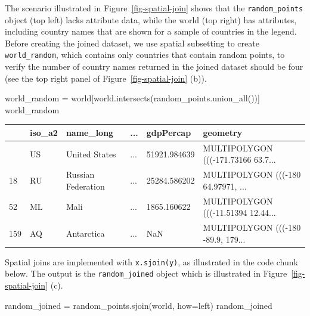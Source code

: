 \documentclass[
  letterpaper,
]{krantz}
\newenvironment{Shaded}{\begin{snugshade}}{\end{snugshade}}
\newcommand{\NormalTok}[1]{\textcolor[rgb]{0.00,0.23,0.31}{#1}}
\newcommand{\OperatorTok}[1]{\textcolor[rgb]{0.37,0.37,0.37}{#1}}
\newcommand{\StringTok}[1]{\textcolor[rgb]{0.13,0.47,0.30}{#1}}
\begin{document}
The scenario illustrated in Figure~\ref{fig-spatial-join} shows that the
\texttt{random\_points} object (top left) lacks attribute data, while
the world (top right) has attributes, including country names that are
shown for a sample of countries in the legend. Before creating the
joined dataset, we use spatial subsetting to create
\texttt{world\_random}, which contains only countries that contain
random points, to verify the number of country names returned in the
joined dataset should be four (see the top right panel of
Figure~\ref{fig-spatial-join} (b)).

\begin{Shaded}
\begin{Highlighting}[]
\NormalTok{world\_random }\OperatorTok{=}\NormalTok{ world[world.intersects(random\_points.union\_all())]}
\NormalTok{world\_random}
\end{Highlighting}
\end{Shaded}

\begin{longtable}[]{@{}llllll@{}}
\toprule\noalign{}
& iso\_a2 & name\_long & ... & gdpPercap & geometry \\
\midrule\noalign{}
\endhead
\bottomrule\noalign{}
\endlastfoot
4 & US & United States & ... & 51921.984639 & MULTIPOLYGON (((-171.73166
63.7... \\
18 & RU & Russian Federation & ... & 25284.586202 & MULTIPOLYGON (((-180
64.97971, ... \\
52 & ML & Mali & ... & 1865.160622 & MULTIPOLYGON (((-11.51394
12.44... \\
159 & AQ & Antarctica & ... & NaN & MULTIPOLYGON (((-180 -89.9,
179... \\
\end{longtable}

Spatial joins are implemented with \texttt{x.sjoin(y)}, as illustrated
in the code chunk below. The output is the \texttt{random\_joined}
object which is illustrated in Figure~\ref{fig-spatial-join} (c).

\begin{Shaded}
\begin{Highlighting}[]
\NormalTok{random\_joined }\OperatorTok{=}\NormalTok{ random\_points.sjoin(world, how}\OperatorTok{=}\StringTok{\textquotesingle{}left\textquotesingle{}}\NormalTok{)}
\NormalTok{random\_joined}
\end{Highlighting}
\end{Shaded}
\end{document}
